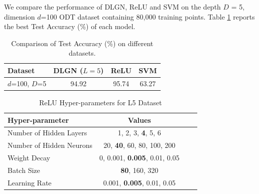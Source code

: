 \documentclass{article}
\theoremstyle{plain}
\theoremstyle{definition}
\theoremstyle{remark}
\newcommand{\1}{{\mathbf 1}}
\newcommand{\0}{{\mathbf 0}}
\renewcommand{\>}{{\rightarrow}}
\begin{document}
We compare the performance of DLGN, ReLU and SVM on the depth $D$ = 5, dimension $d$=100 ODT dataset containing 80,000 training points. Table \ref{tab:comparison} reports the best Test Accuracy (\%) of each model.


\begin{table}[h]
    \centering
    \caption{Comparison of Test Accuracy (\%) on different datasets.}
    \begin{tabular}{|l|c|c|c|}
        \hline
        \textbf{Dataset} & \textbf{DLGN} ($L=5$) & \textbf{ReLU} & \textbf{SVM} \\
        \hline
        $d$=100, $D$=5 & 94.92 & 95.74 & 63.27 \\
        \hline
    \end{tabular}
    \label{tab:comparison}
    \vspace{3 mm}
\end{table}

\begin{table}[h]
    \centering
    \caption{ReLU Hyper-parameters for L5 Dataset}    
    \begin{tabular}{|l|c|c|c|}
        \hline
        \textbf{Hyper-parameter} & \textbf{Values} \\
        \hline
        Number of Hidden Layers & 1, 2, 3, \textbf{4}, 5, 6\\
        Number of Hidden Neurons & 20, \textbf{40}, 60, 80, 100, 200\\
        Weight Decay & 0, 0.001, \textbf{0.005}, 0.01, 0.05\\
        Batch Size & \textbf{80}, 160, 320\\
        Learning Rate & 0.001, \textbf{0.005}, 0.01, 0.05\\
        \hline
    \end{tabular}
    \label{tab:relu5a}
\end{table}
\end{document}
